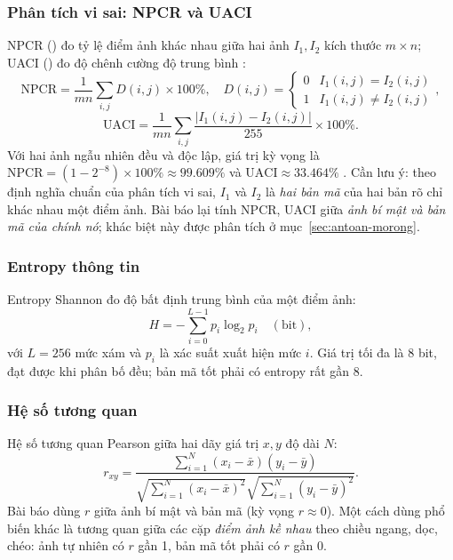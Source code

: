 \subsubsection{Phân tích vi sai: NPCR và UACI}

NPCR () đo tỷ lệ điểm ảnh khác nhau giữa hai ảnh $I_1, I_2$
kích thước $m\times n$; UACI () đo độ chênh cường độ trung
bình \cite{wu2011npcr}:
\begin{equation}
  \mathrm{NPCR} = \frac{1}{mn}\sum_{i,j} D(i,j)\times100\%, \quad
  D(i,j) = \begin{cases}0 & I_1(i,j) = I_2(i,j)\\ 1 & I_1(i,j) \neq I_2(i,j)\end{cases},
  \label{eq:npcr}
\end{equation}
\begin{equation}
  \mathrm{UACI} = \frac{1}{mn}\sum_{i,j}\frac{|I_1(i,j) - I_2(i,j)|}{255}\times100\%.
  \label{eq:uaci}
\end{equation}
Với hai ảnh ngẫu nhiên đều và độc lập, giá trị kỳ vọng là
$\mathrm{NPCR} = (1 - 2^{-8})\times100\% \approx 99.609\%$ và $\mathrm{UACI} \approx 33.464\%$
\cite{wu2011npcr}. Cần lưu ý: theo định nghĩa chuẩn của phân tích vi sai, $I_1$ và $I_2$ là
\emph{hai bản mã} của hai bản rõ chỉ khác nhau một điểm ảnh. Bài báo lại tính NPCR, UACI giữa
\emph{ảnh bí mật và bản mã của chính nó}; khác biệt này được phân tích ở
mục~\ref{sec:antoan-morong}.

\subsubsection{Entropy thông tin}

Entropy Shannon \cite{shannon1948} đo độ bất định trung bình của một điểm ảnh:
\begin{equation}
  H = -\sum_{i=0}^{L-1} p_i \log_2 p_i \quad (\text{bit}),
  \label{eq:entropy}
\end{equation}
với $L = 256$ mức xám và $p_i$ là xác suất xuất hiện mức $i$. Giá trị tối đa là 8 bit, đạt được
khi phân bố đều; bản mã tốt phải có entropy rất gần 8.

\subsubsection{Hệ số tương quan}

Hệ số tương quan Pearson giữa hai dãy giá trị $x, y$ độ dài $N$:
\begin{equation}
  r_{xy} = \frac{\sum_{i=1}^N (x_i - \bar x)(y_i - \bar y)}
                {\sqrt{\sum_{i=1}^N (x_i - \bar x)^2}\sqrt{\sum_{i=1}^N (y_i - \bar y)^2}}.
  \label{eq:corr}
\end{equation}
Bài báo dùng $r$ giữa ảnh bí mật và bản mã (kỳ vọng $r \approx 0$). Một cách dùng phổ biến khác
là tương quan giữa các cặp \emph{điểm ảnh kề nhau} theo chiều ngang, dọc, chéo: ảnh tự nhiên có
$r$ gần 1, bản mã tốt phải có $r$ gần 0.

